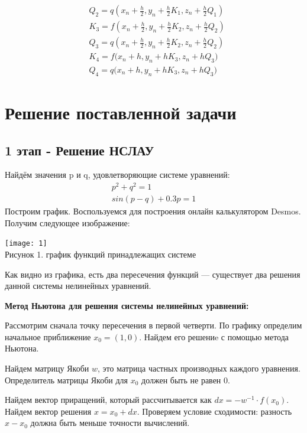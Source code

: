 \documentclass[a4paper,12pt]{article}
\begin{document}
$$
\begin{aligned}
	&Q_{2}=q\left(x_{n}+\frac{h}{2}, y_{n}+\frac{h}{2} K_{1}, z_{n}+\frac{h}{2} Q_{1}\right) \\
	&K_{3}=f\left(x_{n}+\frac{h}{2}, y_{n}+\frac{h}{2} K_{2}, z_{n}+\frac{h}{2} Q_{2}\right) \\
	&Q_{3}=q\left(x_{n}+\frac{h}{2}, y_{n}+\frac{h}{2} K_{2}, z_{n}+\frac{h}{2} Q_{2}\right) \\
	&K_{4}=f\bigg(x_{n}+h, y_{n}+h K_{3}, z_{n}+h Q_{3}\bigg) \\
	&Q_{4}=q\bigg(x_{n}+h, y_{n}+h K_{3}, z_{n}+h Q_{3}\bigg)
\end{aligned}
$$
\clearpage
\section{Решение поставленной задачи}
\subsection{1 этап - Решение НСЛАУ}
Найдём значения p и q, удовлетворяющие системе уравнений:
$$
\begin{array}{c}
	p^{2}+q^{2}=1\\
	sin(p-q)+0.3p=1
\end{array}
$$
Построим график. Воспользуемся для построения онлайн калькулятором Desmos. Получим следующее изображение:

\begin{center}
	\texttt{[image: 1]}\\
	\color{blue}
	Рисунок 1. график функций принадлежащих системе
\end{center}

Как видно из графика, есть два пересечения функций — существует два решения данной системы нелинейных уравнений.

\begin{center}
	\textbf{Метод Ньютона для решения системы нелинейных уравнений:}
\end{center}
Рассмотрим сначала точку пересечения в первой четверти. По графику определим начальное приближение $ x_{0}=(1,0) $. Найдем его решениe с помощью метода Ньютона.

Найдем матрицу Якоби $ w $, это матрица частных производных каждого уравнения. Определитель матрицы Якоби для $ x_{0} $ должен быть не равен 0.

Найдем вектор приращений, который рассчитывается как 
$dx = -w^{-1} \cdot f(x_{0}) $. Найдем вектор решения $ x=x_{0}+ dx $. Проверяем условие сходимости: разность $ x-x_{0} $ должна быть меньше точности вычислений.
\end{document}
